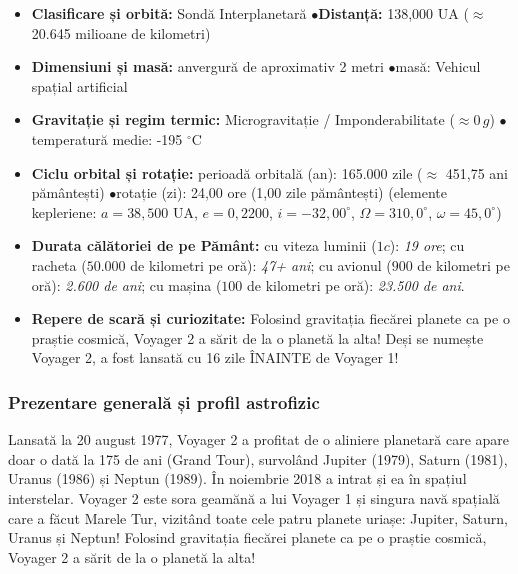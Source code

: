 \begin{tcolorbox}[orbitardata, title={\textbf{Repere esențiale: Voyager 2}}]
\small
\begin{itemize}[leftmargin=1.4em, itemsep=2pt, topsep=2pt]
  \item \textbf{Clasificare și orbită:} Sondă Interplanetară \quad$\bullet$\quad \textbf{Distanță:} 138,000 UA ($\approx$ 20.645 milioane de kilometri)
  \item \textbf{Dimensiuni și masă:} anvergură de aproximativ 2 metri \quad$\bullet$\quad masă: Vehicul spațial artificial
  \item \textbf{Gravitație și regim termic:} Microgravitație / Imponderabilitate ($\approx 0\,g$) \quad$\bullet$\quad temperatură medie: -195 $^\circ$C
  \item \textbf{Ciclu orbital și rotație:} perioadă orbitală (an): 165.000 zile ($\approx$ 451,75 ani pământești) \quad$\bullet$\quad rotație (zi): 24,00 ore (1,00 zile pământești) (elemente kepleriene: $a = 38,500$ UA, $e = 0,2200$, $i = -32,00^\circ$, $\Omega = 310,0^\circ$, $\omega = 45,0^\circ$)
  \item \textbf{Durata călătoriei de pe Pământ:} cu viteza luminii ($1c$): \emph{19 ore}; cu racheta ($50.000$ de kilometri pe oră): \emph{47+ ani}; cu avionul ($900$ de kilometri pe oră): \emph{2.600 de ani}; cu mașina ($100$ de kilometri pe oră): \emph{23.500 de ani}.
  \item \textbf{Repere de scară și curiozitate:} Folosind gravitația fiecărei planete ca pe o praștie cosmică, Voyager 2 a sărit de la o planetă la alta! Deși se numește Voyager 2, a fost lansată cu 16 zile ÎNAINTE de Voyager 1!
\end{itemize}
\end{tcolorbox}

\subsubsection*{Prezentare generală și profil astrofizic}
Lansată la 20 august 1977, Voyager 2 a profitat de o aliniere planetară care apare doar o dată la 175 de ani (\guillemotleft{}Grand Tour\guillemotright{}), survolând Jupiter (1979), Saturn (1981), Uranus (1986) și Neptun (1989). În noiembrie 2018 a intrat și ea în spațiul interstelar. Voyager 2 este sora geamănă a lui Voyager 1 și singura navă spațială care a făcut \guillemotleft{}Marele Tur\guillemotright{}, vizitând toate cele patru planete uriașe: Jupiter, Saturn, Uranus și Neptun! Folosind gravitația fiecărei planete ca pe o praștie cosmică, Voyager 2 a sărit de la o planetă la alta!

